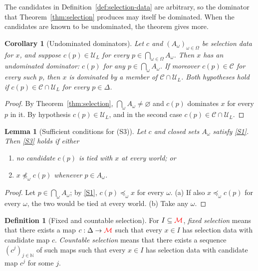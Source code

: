 \documentclass[11pt]{article}
\newcommand{\chg}[1]{{\color{red}#1}}
\newtheorem{lemma}[theorem]{Lemma}
\newtheorem{corollary}[theorem]{Corollary}
\theoremstyle{definition}
\newtheorem{definition}[theorem]{Definition}
\theoremstyle{remark}
\newcommand{\M}{\mathcal M}
\newcommand{\C}{\mathcal C}
\newcommand{\U}{\mathcal U}
\begin{document}
The candidates in Definition~\ref{def:selection-data} are arbitrary, so the dominator that Theorem~\ref{thm:selection} produces may itself be dominated. When the candidates are known to be undominated, the theorem gives more.

\begin{corollary}[Undominated dominators]\label{cor:undominated-dominators}
Let $c$ and $(A_\omega)_{\omega\in\Omega}$ be selection data for $x$, and suppose $c(p)\in\U_L$ for every $p\in\bigcap_{\omega\in\Omega}A_\omega$. Then $x$ has an undominated dominator: $c(p)$ for any $p\in\bigcap_\omega A_\omega$. If moreover $c(p)\in\C$ for every such $p$, then $x$ is dominated by a member of $\C\cap\U_L$. Both hypotheses hold if $c(p)\in\C\cap\U_L$ for every $p\in\Delta$.
\end{corollary}
\begin{proof}
By Theorem~\ref{thm:selection}, $\bigcap_\omega A_\omega\neq\varnothing$ and $c(p)$ dominates $x$ for every $p$ in it. By hypothesis $c(p)\in\U_L$, and in the second case $c(p)\in\C\cap\U_L$.
\end{proof}

\begin{lemma}[Sufficient conditions for (S3)]\label{lem:S3}
Let $c$ and closed sets $A_\omega$ satisfy \ref{S1}. Then \ref{S3} holds if either
\begin{enumerate}[label=(\alph*)]
\item no candidate $c(p)$ is tied with $x$ at every world; or
\item $x\not\preceq_\omega c(p)$ whenever $p\in A_\omega$.
\end{enumerate}
\end{lemma}
\begin{proof}
Let $p\in\bigcap_\omega A_\omega$; by \ref{S1}, $c(p)\preceq_\omega x$ for every $\omega$. (a) If also $x\preceq_\omega c(p)$ for every $\omega$, the two would be tied at every world. (b) Take any $\omega$.
\end{proof}

\begin{definition}[Fixed and countable selection]
For $I\subseteq\chg{\M}$, \emph{fixed selection} means that there exists a map $c:\Delta\to\chg{\M}$ such that every $x\in I$ has selection data with candidate map $c$. \emph{Countable selection} means that there exists a sequence $(c^j)_{j\in\mathbb N}$ of such maps such that every $x\in I$ has selection data with candidate map $c^j$ for some $j$.
\end{definition}
\end{document}
